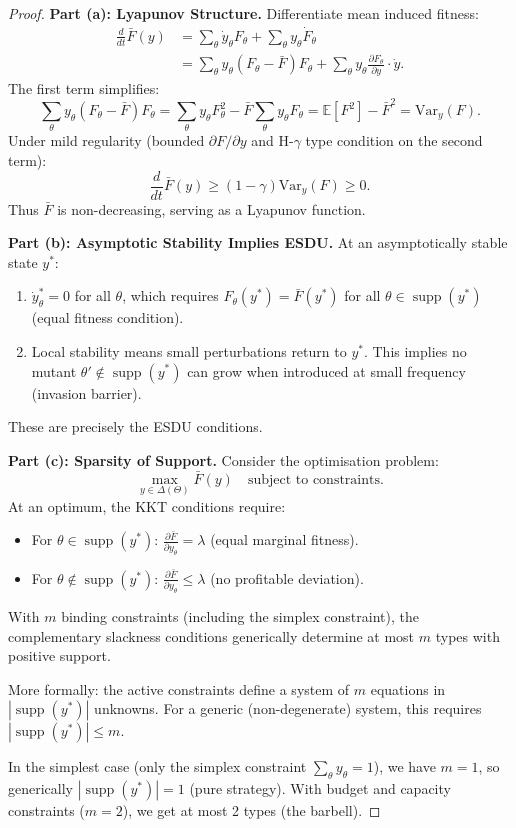\documentclass[12pt]{article}
\newcommand{\E}{\mathbb{E}}
\newcommand{\Var}{\mathrm{Var}}
\DeclareMathOperator{\supp}{supp}
\begin{document}
\begin{proof}
\textbf{Part (a): Lyapunov Structure.}
Differentiate mean induced fitness:
\begin{align*}
\frac{d}{dt} \bar{F}(y) &= \sum_\theta \dot{y}_\theta F_\theta + \sum_\theta y_\theta \dot{F}_\theta \\
&= \sum_\theta y_\theta (F_\theta - \bar{F}) F_\theta + \sum_\theta y_\theta \frac{\partial F_\theta}{\partial y} \cdot \dot{y}.
\end{align*}
The first term simplifies:
\[
\sum_\theta y_\theta (F_\theta - \bar{F}) F_\theta = \sum_\theta y_\theta F_\theta^2 - \bar{F} \sum_\theta y_\theta F_\theta = \E[F^2] - \bar{F}^2 = \Var_y(F).
\]
Under mild regularity (bounded $\partial F / \partial y$ and H-$\gamma$ type condition on the second term):
\[
\frac{d}{dt} \bar{F}(y) \geq (1 - \gamma) \Var_y(F) \geq 0.
\]
Thus $\bar{F}$ is non-decreasing, serving as a Lyapunov function.

\textbf{Part (b): Asymptotic Stability Implies ESDU.}
At an asymptotically stable state $y^*$:
\begin{enumerate}
    \item $\dot{y}^*_\theta = 0$ for all $\theta$, which requires $F_\theta(y^*) = \bar{F}(y^*)$ for all $\theta \in \supp(y^*)$ (equal fitness condition).
    \item Local stability means small perturbations return to $y^*$. This implies no mutant $\theta' \notin \supp(y^*)$ can grow when introduced at small frequency (invasion barrier).
\end{enumerate}
These are precisely the ESDU conditions.

\textbf{Part (c): Sparsity of Support.}
Consider the optimisation problem:
\[
\max_{y \in \Delta(\Theta)} \bar{F}(y) \quad \text{subject to constraints.}
\]
At an optimum, the KKT conditions require:
\begin{itemize}
    \item For $\theta \in \supp(y^*)$: $\frac{\partial \bar{F}}{\partial y_\theta} = \lambda$ (equal marginal fitness).
    \item For $\theta \notin \supp(y^*)$: $\frac{\partial \bar{F}}{\partial y_\theta} \leq \lambda$ (no profitable deviation).
\end{itemize}
With $m$ binding constraints (including the simplex constraint), the complementary slackness conditions generically determine at most $m$ types with positive support.

More formally: the active constraints define a system of $m$ equations in $|\supp(y^*)|$ unknowns. For a generic (non-degenerate) system, this requires $|\supp(y^*)| \leq m$.

In the simplest case (only the simplex constraint $\sum_\theta y_\theta = 1$), we have $m = 1$, so generically $|\supp(y^*)| = 1$ (pure strategy). With budget and capacity constraints ($m = 2$), we get at most 2 types (the barbell).
\end{proof}
\end{document}

